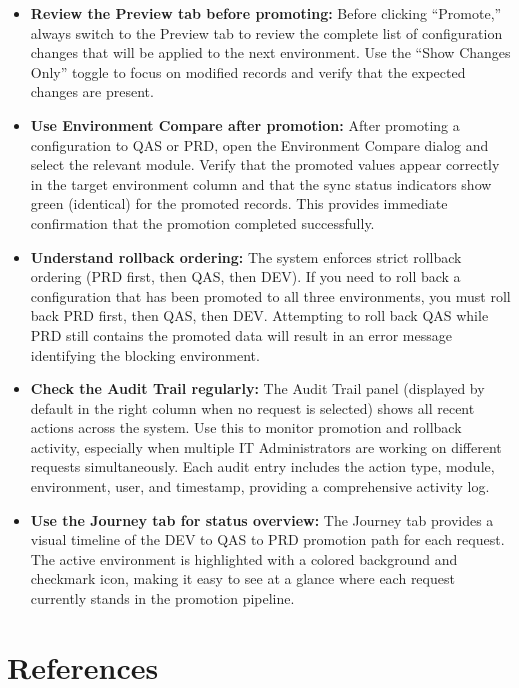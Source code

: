 \documentclass[12pt,a4paper]{report}
\begin{document}
\begin{itemize}[leftmargin=2em]
  \item \textbf{Review the Preview tab before promoting:} Before clicking ``Promote,'' always switch to the Preview tab to review the complete list of configuration changes that will be applied to the next environment. Use the ``Show Changes Only'' toggle to focus on modified records and verify that the expected changes are present.
  \item \textbf{Use Environment Compare after promotion:} After promoting a configuration to QAS or PRD, open the Environment Compare dialog and select the relevant module. Verify that the promoted values appear correctly in the target environment column and that the sync status indicators show green (identical) for the promoted records. This provides immediate confirmation that the promotion completed successfully.
  \item \textbf{Understand rollback ordering:} The system enforces strict rollback ordering (PRD first, then QAS, then DEV). If you need to roll back a configuration that has been promoted to all three environments, you must roll back PRD first, then QAS, then DEV. Attempting to roll back QAS while PRD still contains the promoted data will result in an error message identifying the blocking environment.
  \item \textbf{Check the Audit Trail regularly:} The Audit Trail panel (displayed by default in the right column when no request is selected) shows all recent actions across the system. Use this to monitor promotion and rollback activity, especially when multiple IT Administrators are working on different requests simultaneously. Each audit entry includes the action type, module, environment, user, and timestamp, providing a comprehensive activity log.
  \item \textbf{Use the Journey tab for status overview:} The Journey tab provides a visual timeline of the DEV to QAS to PRD promotion path for each request. The active environment is highlighted with a colored background and checkmark icon, making it easy to see at a glance where each request currently stands in the promotion pipeline.
\end{itemize}


\clearpage
\chapter*{References}
\end{document}
